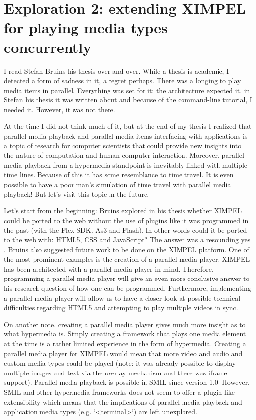 \chapter{Exploration 2: extending XIMPEL for playing media types concurrently}
\label{chap:exploration2}
I read Stefan Bruins his thesis over and over. While a thesis is academic, I detected a form of sadness in it, a regret perhaps. There was a longing to play media items in parallel. Everything was set for it: the architecture expected it, in Stefan his thesis it was written about and because of the command-line tutorial, I needed it. However, it was not there.

At the time I did not think much of it, but at the end of my thesis I realized that parallel media playback and parallel media items interfacing with applications is a topic of research for computer scientists that could provide new insights into the nature of computation and human-computer interaction. Moreover, parallel media playback from a hypermedia standpoint is inevitably linked with multiple time lines. Because of this it has some resemblance to time travel. It is even possible to have a poor man's simulation of time travel with parallel media playback! But let's visit this topic in the future.

Let's start from the beginning: Bruins explored in his thesis whether XIMPEL could be ported to the web without the use of plugins like it was programmed in the past (with the Flex SDK, As3 and Flash). In other words could it be ported to the web with: HTML5, CSS and JavaScript? The answer was a resounding yes \cite{stefan2016}. Bruins also suggested future work to be done on the XIMPEL platform. One of the most prominent examples is the creation of a parallel media player. XIMPEL has been architected with a parallel media player in mind. Therefore, programming a parallel media player will give an even more conclusive answer to his research question of how one can be programmed. Furthermore, implementing a parallel media player will allow us to have a closer look at possible technical difficulties regarding HTML5 and attempting to play multiple videos in sync. 

On another note, creating a parallel media player gives much more insight as to what hypermedia is. Simply creating a framework that plays one media element at the time is a rather limited experience in the form of hypermedia. Creating a parallel media player for XIMPEL would mean that more video and audio and custom media types could be played (note: it was already possible to display multiple images and text via the overlay mechanism and there was iframe support). Parallel media playback is possible in SMIL since version 1.0. However, SMIL and other hypermedia frameworks does not seem to offer a plugin like extensibility which means that the implications of parallel media playback and application media types (e.g. `<terminal>`) are left unexplored. %


